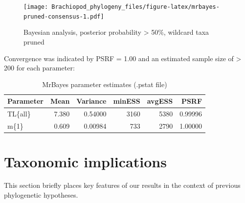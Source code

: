 \documentclass[openany]{book}
\theoremstyle{definition}
\theoremstyle{definition}
\theoremstyle{definition}
\theoremstyle{remark}
\begin{document}
\begin{figure}
\centering
\texttt{[image: Brachiopod\_phylogeny\_files/figure-latex/mrbayes-pruned-consensus-1.pdf]}
\caption{\label{fig:mrbayes-pruned-consensus}Bayesian analysis, posterior
probability \textgreater{} 50\%, wildcard taxa pruned}
\end{figure}

Convergence was indicated by PSRF = 1.00 and an estimated sample size of
\textgreater{} 200 for each parameter:

\begin{table}

\caption{\label{tab:mrbayes-parameter-summary}MrBayes parameter estimates (.pstat file)}
\centering
\begin{tabular}[t]{l|r|r|r|r|r}
\hline
Parameter & Mean & Variance & minESS & avgESS & PSRF\\
\hline
TL\{all\} & 7.380 & 0.54000 & 3160 & 5380 & 0.99996\\
\hline
m\{1\} & 0.609 & 0.00984 & 733 & 2790 & 1.00000\\
\hline
\end{tabular}
\end{table}

\hypertarget{taxonomic-implications}{%
\chapter{Taxonomic implications}\label{taxonomic-implications}}

This section briefly places key features of our results in the context
of previous phylogenetic hypotheses.
\end{document}

